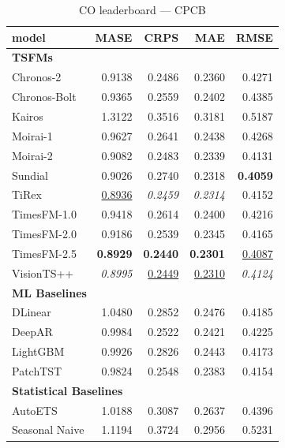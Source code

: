 \begin{table}[H]
\caption{CO leaderboard --- CPCB}
\centering
\begin{small}
\begin{tabular}{lrrrr}
\toprule
model & MASE & CRPS & MAE & RMSE \\
\midrule
\multicolumn{5}{l}{\textbf{TSFMs}} \\
Chronos-2 & 0.9138 & 0.2486 & 0.2360 & 0.4271 \\
Chronos-Bolt & 0.9365 & 0.2559 & 0.2402 & 0.4385 \\
Kairos & 1.3122 & 0.3516 & 0.3181 & 0.5187 \\
Moirai-1 & 0.9627 & 0.2641 & 0.2438 & 0.4268 \\
Moirai-2 & 0.9082 & 0.2483 & 0.2339 & 0.4131 \\
Sundial & 0.9026 & 0.2740 & 0.2318 & \textbf{0.4059} \\
TiRex & \underline{0.8936} & \textit{0.2459} & \textit{0.2314} & 0.4152 \\
TimesFM-1.0 & 0.9418 & 0.2614 & 0.2400 & 0.4216 \\
TimesFM-2.0 & 0.9186 & 0.2539 & 0.2345 & 0.4165 \\
TimesFM-2.5 & \textbf{0.8929} & \textbf{0.2440} & \textbf{0.2301} & \underline{0.4087} \\
VisionTS++ & \textit{0.8995} & \underline{0.2449} & \underline{0.2310} & \textit{0.4124} \\
\midrule
\multicolumn{5}{l}{\textbf{ML Baselines}} \\
DLinear & 1.0480 & 0.2852 & 0.2476 & 0.4185 \\
DeepAR & 0.9984 & 0.2522 & 0.2421 & 0.4225 \\
LightGBM & 0.9926 & 0.2826 & 0.2443 & 0.4173 \\
PatchTST & 0.9824 & 0.2548 & 0.2383 & 0.4154 \\
\midrule
\multicolumn{5}{l}{\textbf{Statistical Baselines}} \\
AutoETS & 1.0188 & 0.3087 & 0.2637 & 0.4396 \\
Seasonal Naive & 1.1194 & 0.3724 & 0.2956 & 0.5231 \\
\bottomrule
\end{tabular}
\end{small}
\end{table}